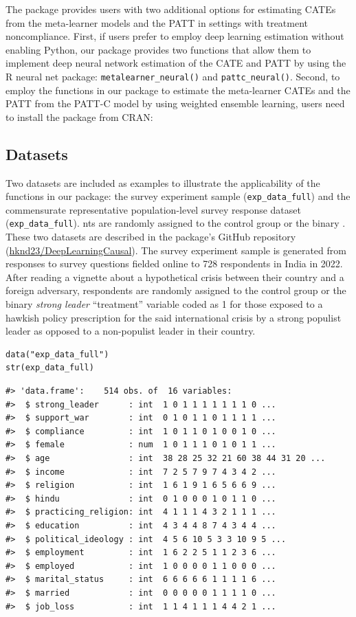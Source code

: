 The  package provides users with two additional
options for estimating CATEs from the meta-learner models and the PATT
in settings with treatment noncompliance. First, if users prefer to
employ deep learning estimation without enabling Python, our package
provides two functions that allow them to implement deep neural network
estimation of the CATE and PATT by using the R neural net package:
\texttt{metalearner\_neural()} and \texttt{pattc\_neural()}. Second, to employ the
functions in our package to estimate the meta-learner CATEs and the PATT
from the PATT-C model by using weighted ensemble learning, users need to
install the  package from CRAN:

\subsection{Datasets}\label{datasets}

Two datasets are included as examples to illustrate the applicability
of the functions in our package: the survey experiment sample
(\texttt{exp\_data\_full}) and the commensurate representative population-level
survey response dataset (\texttt{exp\_data\_full}). nts are randomly assigned to
the control group or the binary . These two datasets are described in
the package's GitHub repository
(\href{https://github.com/hknd23/DeepLearningCausal}{hknd23/DeepLearningCausal}).
The survey experiment sample is generated from responses to survey
questions fielded online to 728 respondents in India in 2022. After
reading a vignette about a hypothetical crisis between their country and
a foreign adversary, respondents are randomly assigned to the control
group or the binary \emph{strong leader} ``treatment'' variable coded as 1 for
those exposed to a hawkish policy prescription for the said
international crisis by a strong populist leader as opposed to a
non-populist leader in their country.

\begin{verbatim}
data("exp_data_full") 
str(exp_data_full) 
\end{verbatim}

\begin{verbatim}
#> 'data.frame':    514 obs. of  16 variables:
#>  $ strong_leader      : int  1 0 1 1 1 1 1 1 1 0 ...
#>  $ support_war        : int  0 1 0 1 1 0 1 1 1 1 ...
#>  $ compliance         : int  1 0 1 1 0 1 0 0 1 0 ...
#>  $ female             : num  1 0 1 1 1 0 1 0 1 1 ...
#>  $ age                : int  38 28 25 32 21 60 38 44 31 20 ...
#>  $ income             : int  7 2 5 7 9 7 4 3 4 2 ...
#>  $ religion           : int  1 6 1 9 1 6 5 6 6 9 ...
#>  $ hindu              : int  0 1 0 0 0 1 0 1 1 0 ...
#>  $ practicing_religion: int  4 1 1 1 4 3 2 1 1 1 ...
#>  $ education          : int  4 3 4 4 8 7 4 3 4 4 ...
#>  $ political_ideology : int  4 5 6 10 5 3 3 10 9 5 ...
#>  $ employment         : int  1 6 2 2 5 1 1 2 3 6 ...
#>  $ employed           : int  1 0 0 0 0 1 1 0 0 0 ...
#>  $ marital_status     : int  6 6 6 6 6 1 1 1 1 6 ...
#>  $ married            : int  0 0 0 0 0 1 1 1 1 0 ...
#>  $ job_loss           : int  1 1 4 1 1 1 4 4 2 1 ...
\end{verbatim}


